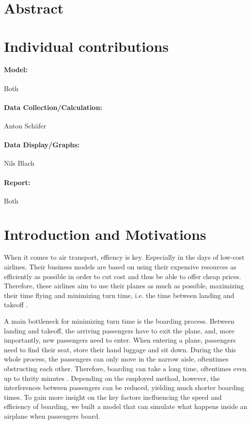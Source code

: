 \documentclass[11pt]{article}
\begin{document}
\section{Abstract}

\section{Individual contributions}



\paragraph{Model:} Both
\paragraph{Data Collection/Calculation:} Anton Sch{\"a}fer
\paragraph{Data Display/Graphs:} Nils Blach
\paragraph{Report:} Both

\section{Introduction and Motivations}
When it comes to air transport, effiency is key. Especially in the days of low-cost airlines. Their business models are based on using their expensive resources as efficiently as possible in order to cut cost and thus be able to offer cheap prices. Therefore, these airlines aim to use their planes as much as possible, maximizing their time flying and minimizing turn time, i.e. the time between landing and takeoff \cite{barrett}.

A main bottleneck for minimizing turn time is the boarding process. Between landing and takeoff, the arriving passengers have to exit the plane, and, more importantly, new passengers need to enter. When entering a plane, passengers need to find their seat, store their hand luggage and sit down. During the this whole process, the passengers can only move in the narrow aisle, oftentimes obstructing each other. Therefore, boarding can take a long time, oftentimes even up to thrity minutes \cite{beus}. Depending on the employed method, however, the interferences between passengers can be reduced, yielding much shorter boarding times. To gain more insight on the key factors incfluencing the speed and efficiency of boarding, we built a model that can simulate what happens inside an airplane when passengers board.
\end{document}
